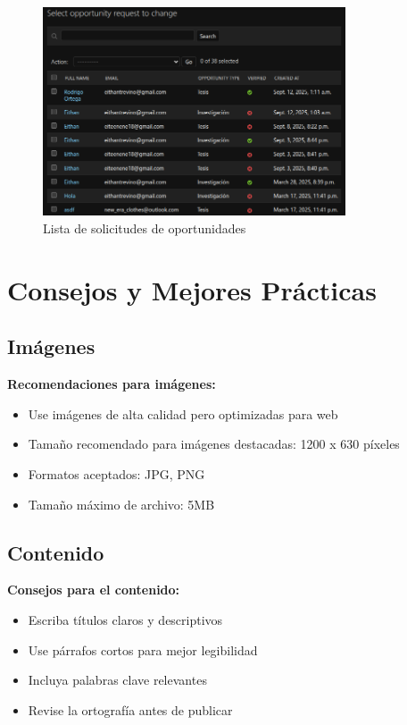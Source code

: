 \documentclass[12pt,letterpaper]{report}
\begin{document}
\begin{figure}[H]
    \centering
    \includegraphics[width=0.8\textwidth]{images/opportunity_requests.png}
    \caption{Lista de solicitudes de oportunidades}
\end{figure}



\chapter{Consejos y Mejores Prácticas}

\section{Imágenes}
\begin{tcolorbox}[colback=blue!5,colframe=liese-blue]
\textbf{Recomendaciones para imágenes:}
\begin{itemize}
    \item Use imágenes de alta calidad pero optimizadas para web
    \item Tamaño recomendado para imágenes destacadas: 1200 x 630 píxeles
    \item Formatos aceptados: JPG, PNG
    \item Tamaño máximo de archivo: 5MB
\end{itemize}
\end{tcolorbox}

\section{Contenido}
\begin{tcolorbox}[colback=blue!5,colframe=liese-blue]
\textbf{Consejos para el contenido:}
\begin{itemize}
    \item Escriba títulos claros y descriptivos
    \item Use párrafos cortos para mejor legibilidad
    \item Incluya palabras clave relevantes
    \item Revise la ortografía antes de publicar
\end{itemize}
\end{tcolorbox}
\end{document}
